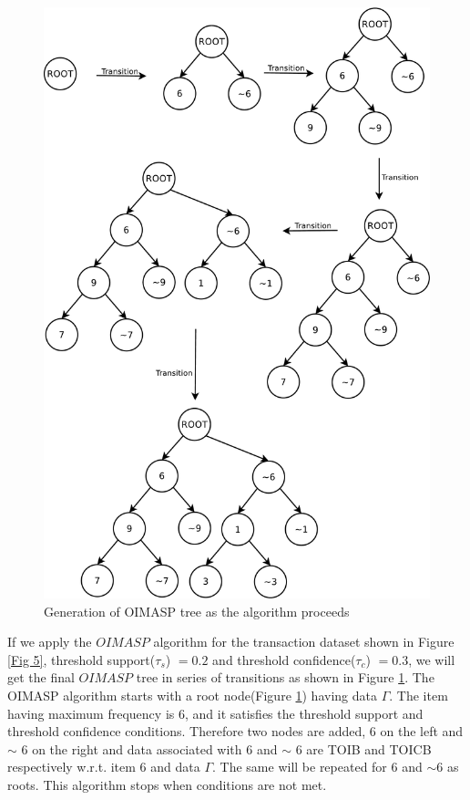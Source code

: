 \documentclass[5p, twocolumn]{elsarticle}
\begin{document}
\begin{figure}
\begin{center}
\includegraphics[scale=0.3]{pdf/transition}
\end{center}
\caption{Generation of OIMASP tree as the algorithm proceeds}
\label{Fig 6}
\end{figure}

If we apply the $ OIMASP $ algorithm for the transaction dataset shown in Figure \ref{Fig 5}, threshold support($ \tau _{s} $) $ = 0.2 $ and threshold confidence($ \tau _{c} $) $ = 0.3 $, we will get the final $ OIMASP $ tree in series of transitions as shown in Figure \ref{Fig 6}. The OIMASP algorithm starts with a root node(Figure \ref{Fig 6}) having data $ \Gamma $. The item having maximum frequency is 6, and it satisfies the threshold support and threshold confidence conditions. Therefore two nodes are added, 6 on the left and $ \sim $ 6 on the right and data associated with 6 and  $ \sim $ 6 are TOIB and TOICB respectively w.r.t. item 6 and data $ \Gamma $. The same will be repeated for 6 and $ \sim $6 as roots. This algorithm stops when conditions are not met.
\end{document}
